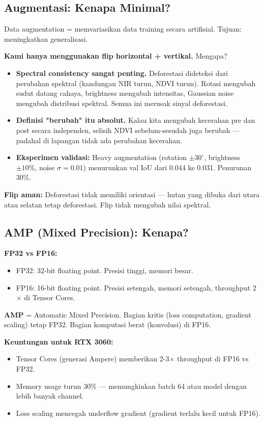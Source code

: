 \documentclass[10pt,a4paper,onecolumn]{article}
\begin{document}
\subsection{Augmentasi: Kenapa Minimal?}

Data augmentation = memvariasikan data training secara artifisial.
Tujuan: meningkatkan generalisasi.

\textbf{Kami hanya menggunakan flip horizontal + vertikal.}
Mengapa?
\begin{itemize}[nosep]
    \item \textbf{Spectral consistency sangat penting.} Deforestasi
          dideteksi dari perubahan spektral (kandungan NIR turun,
          NDVI turun). Rotasi mengubah sudut datang cahaya, brightness
          mengubah intensitas, Gaussian noise mengubah distribusi
          spektral. Semua ini merusak sinyal deforestasi.
    \item \textbf{Definisi "berubah" itu absolut.} Kalau kita
          mengubah kecerahan pre dan post secara independen, selisih
          NDVI sebelum-sesudah juga berubah — padahal di lapangan
          tidak ada perubahan kecerahan.
    \item \textbf{Eksperimen validasi:} Heavy augmentation (rotation
          $\pm 30^\circ$, brightness $\pm 10\%$, noise $\sigma=0.01$)
          menurunkan val IoU dari 0.044 ke 0.031. Penurunan 30\%.
\end{itemize}

\textbf{Flip aman:} Deforestasi tidak memiliki orientasi — hutan
yang dibuka dari utara atau selatan tetap deforestasi. Flip tidak
mengubah nilai spektral.

\subsection{AMP (Mixed Precision): Kenapa?}

\textbf{FP32 vs FP16:}
\begin{itemize}[nosep]
    \item FP32: 32-bit floating point. Presisi tinggi, memori besar.
    \item FP16: 16-bit floating point. Presisi setengah, memori
          setengah, throughput 2$\times$ di Tensor Cores.
\end{itemize}

\textbf{AMP} = Automatic Mixed Precision. Bagian kritis (loss
computation, gradient scaling) tetap FP32. Bagian komputasi berat
(konvolusi) di FP16.

\textbf{Keuntungan untuk RTX 3060:}
\begin{itemize}[nosep]
    \item Tensor Cores (generasi Ampere) memberikan 2-3$\times$
          throughput di FP16 vs FP32.
    \item Memory usage turun 30\% — memungkinkan batch 64 atau
          model dengan lebih banyak channel.
    \item Loss scaling mencegah underflow gradient (gradient terlalu
          kecil untuk FP16).
\end{itemize}
\end{document}

